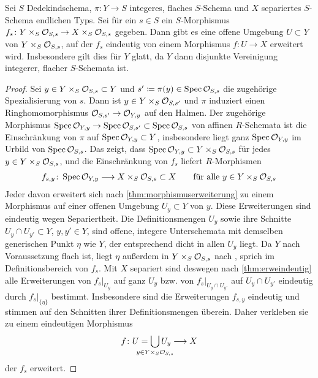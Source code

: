 \begin{Korollar}\label{thm:allgmorphismuserweiterung}
  Sei $S$ Dedekindschema,
  $\pi\colon Y\to S$ integeres, flaches $S$-Schema
  und $X$ separiertes $S$-Schema endlichen Typs.
  Sei für ein $s\in S$ ein $S$-Morphismus
  $f_s\colon Y\times_S\mathcal{O}_{S,s}\to X\times_S\mathcal{O}_{S,s}$ gegeben.
  Dann gibt es eine offene Umgebung $U\subset Y$ von
  $Y\times_S\mathcal{O}_{S,s}$, auf der $f_s$ eindeutig von einem Morphismus
  $f\colon U\to X$ erweitert wird.
  Insbesondere gilt dies für $Y$ glatt, da $Y$ dann disjunkte
  Vereinigung integerer, flacher $S$-Schemata ist.
  \begin{proof}
    Sei $y\in Y\times_S\mathcal{O}_{S,s}\subset Y$ und
    $s'\coloneqq\pi(y)\in\operatorname{Spec}\mathcal{O}_{S,s}$ die zugehörige Spezialisierung
    von $s$. Dann ist $y\in Y\times_S\mathcal{O}_{S,s'}$ und $\pi$ induziert einen
    Ringhomomorphismus $\mathcal{O}_{S,s'}\to\mathcal{O}_{Y,y}$ auf den Halmen. Der
    zugehörige Morphismus
    $\operatorname{Spec}\mathcal{O}_{Y,y}\to\operatorname{Spec}\mathcal{O}_{S,s'}\subset\operatorname{Spec}\mathcal{O}_{S,s}$
    von affinen $R$-Schemata ist die Einschränkung von $\pi$ auf
    $\operatorname{Spec}\mathcal{O}_{Y,y}\subset Y$, insbesondere  liegt ganz $\operatorname{Spec}\mathcal{O}_{Y,y}$
    im Urbild von $\operatorname{Spec}\mathcal{O}_{S,s}$.
    Das zeigt, dass $\operatorname{Spec}\mathcal{O}_{Y,y}\subset Y\times_S\mathcal{O}_{S,s}$ für jedes
    $y\in Y\times_S\mathcal{O}_{S,s}$, und die Einschränkung von $f_s$ liefert
    $R$-Morphismen
    \begin{gather*}
      f_{s,y}\colon \operatorname{Spec}\mathcal{O}_{Y,y}\longrightarrow X\times_S\mathcal{O}_{S,s}\subset X
      \qquad \text{für alle } y \in Y\times_S\mathcal{O}_{S,s}
    \end{gather*}
    Jeder davon erweitert sich nach \ref{thm:morphismuserweiterung}
    zu einem Morphismus auf einer offenen Umgebung $U_y\subset Y$ von
    $y$.
    Diese Erweiterungen sind eindeutig wegen Separiertheit.
    Die Definitionsmengen $U_y$ sowie ihre Schnitte $U_y\cap
    U_{y'}\subset Y$, $y,y'\in Y$, sind offene, integere
    Unterschemata mit demselben generischen Punkt $\eta$ wie $Y$, der
    entsprechend dicht in allen $U_y$ liegt.
    Da $Y$ nach Voraussetzung flach ist, liegt $\eta$ außerdem in
    $Y\times_S\mathcal{O}_{S,s}$ nach \cite[Proposition 14.14]{wedhorn}, sprich
    im Definitionsbereich von $f_s$. Mit $X$ separiert sind deswegen nach
    \ref{thm:erweindeutig} alle Erweiterungen von $f_s|_{U_y}$ auf
    ganz $U_y$ bzw. von $f_s|_{U_y\cap U_{y'}}$ auf $U_y\cap U_{y'}$
    eindeutig durch $f_s|_{\{\eta\}}$ bestimmt.
    Insbesondere sind die Erweiterungen $f_{s,y}$ eindeutig und
    stimmen auf den Schnitten ihrer Definitionsmengen überein.
    Daher verkleben sie zu einem eindeutigen Morphismus
    \begin{gather*}
      f\colon U=\bigcup_{\mathclap{y\in Y\times_S\O_{S,s}}} U_y\longto X
    \end{gather*}
    der $f_s$ erweitert.
  \end{proof}
\end{Korollar}
